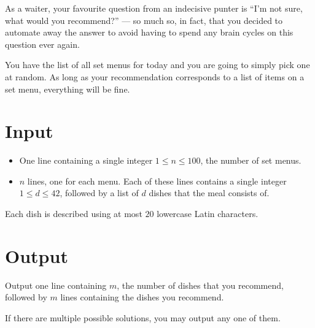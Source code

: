
As a waiter, your favourite question from an indecisive punter is ``I'm not sure, what would
you recommend?'' --- so much so, in fact, that you decided to automate away the answer to
avoid having to spend any brain cycles on this question ever again.

You have the list of all set menus for today and you are going to simply pick one at random.
As long as your recommendation corresponds to a list of items on a set menu, everything will
be fine.

\section*{Input}
    \begin{itemize}
        \item One line containing a single integer $1\leq n\leq 100$,
            the number of set menus.
        \item $n$ lines, one for each menu.
            Each of these lines contains a single integer $1\leq d\leq 42$,
            followed by a list of $d$ dishes that the meal consists of.
    \end{itemize}
    Each dish is described using at most $20$ lowercase Latin characters.

\section*{Output}
	Output one line containing $m$, the number of dishes that you recommend, followed by $m$ lines
  containing the dishes you recommend.

  If there are multiple possible solutions, you may output any one of them.

